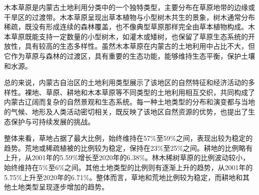 \documentclass{article}
\begin{document}
		木本草原是内蒙古土地利用分类中的一个独特类型，主要分布在草原地带的边缘或干旱区的过渡带。木本草原呈现出草本植物与小型树木共生的景象，树木通常分布稀疏，既没有形成连续的森林覆盖，也不像典型草原那样完全由草本植物构成。木本草原既能支持一定数量的小型树木，如灌木或矮树，也保留了草原生态系统的开放性，具有较高的生态多样性。虽然木本草原在内蒙古的土地利用中占比不大，但它作为草原与森林的过渡区，具有重要的生态功能，能够维持生态平衡，保护土壤和水源。
		
		总的来说，内蒙古自治区的土地利用类型展示了该地区的自然特征和经济活动的多样性。裸地、草原、耕地和木本草原等不同类型的土地利用相互交织，共同构成了内蒙古辽阔而复杂的自然景观和生态系统。每一种土地类型的分布和演变都与当地的气候、地形及人类活动密切相关，既反映了该地区自然资源的优势，也提出了生态保护与可持续发展的挑战。
		
		整体来看，草地占据了最大比例，始终维持在57\%至59\%之间，表现出较为稳定的趋势。荒地或稀疏植被的比例较为稳定，保持在23\%至25\%之间。耕地的比例略有上升，从2001年的5.59\%增长至2020年的6.38\%。林木稀树草原的比例波动较小，始终维持在5\%至6\%之间。其他土地类型的比例则有逐渐上升的趋势，从2001年的5.75\%上升至2020年的6.71\%。整体而言，草地和荒地比例较为稳定，而耕地和其他土地类型呈现逐步增加的趋势。
\end{document}

